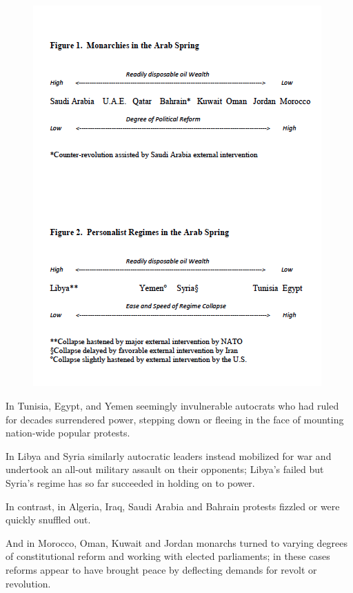 \subsection{\cite{goldstone_bringing_2013}}

    \begin{figure}[h]
        \centering
        \includegraphics[width=.8\textwidth]{goldstone_2013_ssrn.png}
        \caption{\cite{goldstone_bringing_2013}}
        \label{fig:init_res}
    \end{figure}  

In Tunisia, Egypt, and Yemen seemingly invulnerable autocrats who had ruled for decades surrendered power, stepping down or fleeing in the face of mounting nation-wide popular protests. 

In Libya and Syria similarly autocratic leaders instead mobilized for war and undertook an all-out military assault on their opponents; Libya’s failed but Syria’s regime has so far succeeded in holding on to power. 

In contrast, in Algeria, Iraq, Saudi Arabia and Bahrain protests fizzled or were quickly snuffled out. 

And in Morocco, Oman, Kuwait and Jordan monarchs turned to varying degrees of constitutional reform and working with elected parliaments; in these cases reforms appear to have brought peace by deflecting demands for revolt or revolution.

